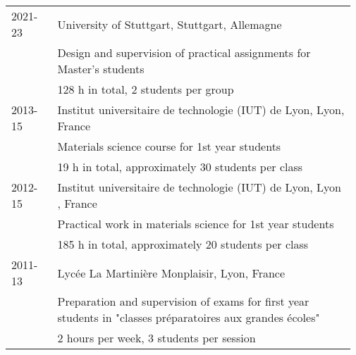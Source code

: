 \documentclass[a4paper,11pt]{concours}
\begin{document}
\begin{table}[htbp]
\begin{tabular}{@{} p{0.13\linewidth} p{0.84\linewidth} @{}}
\vspace{-0.3cm}
2021-23 & University of Stuttgart, Stuttgart, Allemagne \\
& Design and supervision of practical assignments for Master's students\\
& 128 h in total, 2 students per group \\
\hline \hline
2013-15 & Institut universitaire de technologie (IUT) de Lyon, Lyon, France \\
& Materials science course for 1st year students \\
& 19 h in total, approximately 30 students per class \\
\hline \hline
2012-15 & Institut universitaire de technologie (IUT) de Lyon, Lyon , France \\
& Practical work in materials science for 1st year students \\ 
& 185 h in total, approximately 20 students per class \\
\hline \hline
2011-13 & Lycée La Martinière Monplaisir, Lyon, France \\
& Preparation and supervision of exams for first year students in "classes préparatoires
aux grandes écoles" \\
& 2 hours per week, 3 students per session \\
\end{tabular}
\end{table}


\newpage
\end{document}
